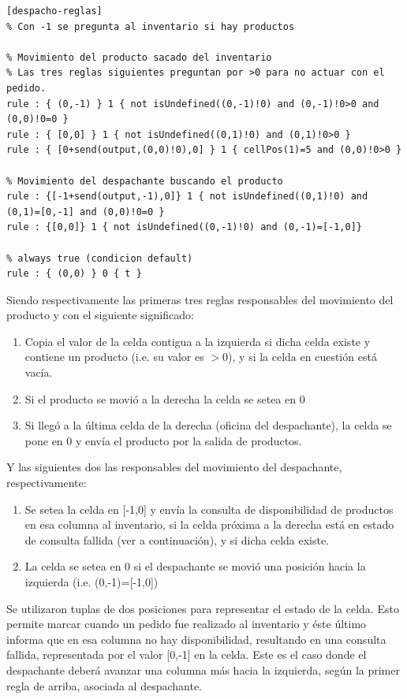 \documentclass[10pt]{article}
\begin{document}
\begin{minipage}{1\textwidth}
	\centering
	\begin{lstlisting}
[despacho-reglas]
% Con -1 se pregunta al inventario si hay productos

% Movimiento del producto sacado del inventario
% Las tres reglas siguientes preguntan por >0 para no actuar con el pedido.
rule : { (0,-1) } 1 { not isUndefined((0,-1)!0) and (0,-1)!0>0 and (0,0)!0=0 }
rule : { [0,0] } 1 { not isUndefined((0,1)!0) and (0,1)!0>0 }
rule : { [0+send(output,(0,0)!0),0] } 1 { cellPos(1)=5 and (0,0)!0>0 }          

% Movimiento del despachante buscando el producto
rule : {[-1+send(output,-1),0]} 1 { not isUndefined((0,1)!0) and (0,1)=[0,-1] and (0,0)!0=0 }
rule : {[0,0]} 1 { not isUndefined((0,-1)!0) and (0,-1)=[-1,0]}

% always true (condicion default)
rule : { (0,0) } 0 { t }
	\end{lstlisting}
\end{minipage}

Siendo respectivamente las primeras tres reglas responsables del movimiento del producto y con el siguiente significado:
\begin{enumerate}
	\item Copia el valor de la celda contigua a la izquierda si dicha celda existe y contiene un producto (i.e. su valor es $>0$), y si la celda en cuestión está vacía.
	\item Si el producto se movió a la derecha la celda se setea en 0
	\item Si llegó a la última celda de la derecha (oficina del despachante), la celda se pone en 0 y envía el producto por la salida de productos.
\end{enumerate}

Y las siguientes dos las responsables del movimiento del despachante, respectivamente:
\begin{enumerate}
	\item Se setea la celda en [-1,0] y envía la consulta de disponibilidad de productos en esa columna al inventario, si la celda próxima a la derecha está en estado de consulta fallida (ver a continuación), y si dicha celda existe.
	\item La celda se setea en 0 si el despachante se movió una posición hacia la izquierda (i.e. (0,-1)=[-1,0])
\end{enumerate}

Se utilizaron tuplas de dos posiciones para representar el estado de la celda. Esto permite marcar cuando un pedido fue realizado al inventario y éste último informa que en esa columna no hay disponibilidad, resultando en una consulta fallida, representada por el valor [0,-1] en la celda. Este es el caso donde el despachante deberá avanzar una columna más hacia la izquierda, según la primer regla de arriba, asociada al despachante.
\end{document}
